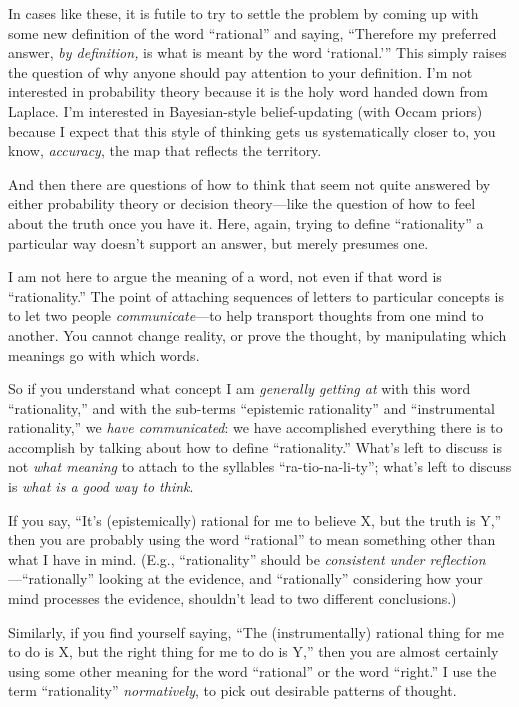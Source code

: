 {
 In cases like these, it is futile to try to settle the problem by
coming up with some new definition of the word
``rational'' and saying,
``Therefore my preferred answer, \textit{by
definition,} is what is meant by the word
`rational.''' This
simply raises the question of why anyone should pay attention to your
definition. I'm not interested in probability theory
because it is the holy word handed down from Laplace.
I'm interested in Bayesian-style belief-updating (with
Occam priors) because I expect that this style of thinking gets us
systematically closer to, you know, \textit{accuracy}, the map that
reflects the territory.}

{
 And then there are questions of how to think that seem not quite
answered by either probability theory or decision theory---like the
question of how to feel about the truth once you have it. Here, again,
trying to define ``rationality'' a
particular way doesn't support an answer, but merely
presumes one.}

{
 I am not here to argue the meaning of a word, not even if that
word is ``rationality.'' The point
of attaching sequences of letters to particular concepts is to let two
people \textit{communicate}{}---to help transport thoughts from one
mind to another. You cannot change reality, or prove the thought, by
manipulating which meanings go with which words.}

{
 So if you understand what concept I am \textit{generally getting
at} with this word ``rationality,''
and with the sub-terms ``epistemic
rationality'' and ``instrumental
rationality,'' we \textit{have communicated}: we have
accomplished everything there is to accomplish by talking about how to
define ``rationality.''
What's left to discuss is not \textit{what meaning} to
attach to the syllables
``ra-tio-na-li-ty'';
what's left to discuss is \textit{what is a good way to
think}.}

{
 If you say, ``It's
(epistemically) rational for me to believe X, but the truth is
Y,'' then you are probably using the word
``rational'' to mean something other
than what I have in mind. (E.g.,
``rationality'' should be
\textit{consistent under
reflection}{}---``rationally''
looking at the evidence, and
``rationally'' considering how your
mind processes the evidence, shouldn't lead to two
different conclusions.)}

{
 Similarly, if you find yourself saying, ``The
(instrumentally) rational thing for me to do is X, but the right thing
for me to do is Y,'' then you are almost certainly
using some other meaning for the word
``rational'' or the word
``right.'' I use the term
``rationality''
\textit{normatively}, to pick out desirable patterns of thought.}


